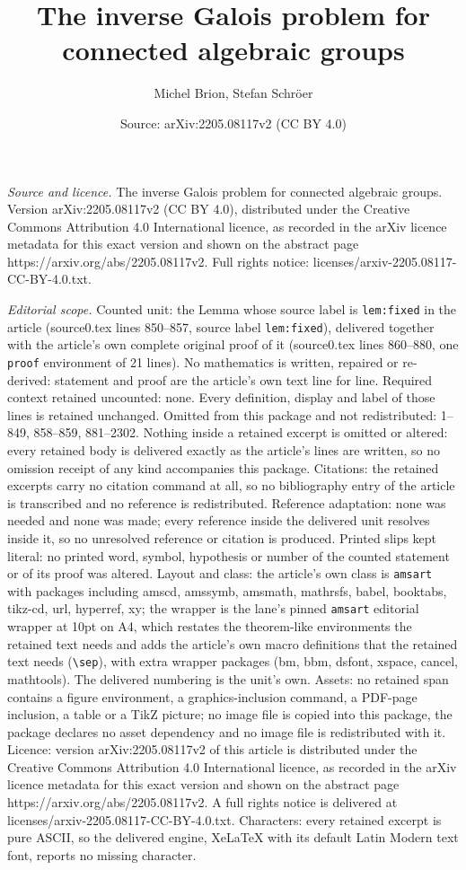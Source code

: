 \documentclass[10pt,a4paper]{amsart}
\title[The inverse Galois problem for connected algebraic groups]{The inverse Galois problem for connected algebraic groups}
\author{Michel Brion, Stefan Schr\"oer}
\date{Source: arXiv:2205.08117v2 (CC BY 4.0)}
\begin{document}
\maketitle

\noindent\emph{Source and licence.} The inverse Galois problem for connected algebraic groups. Version arXiv:2205.08117v2 (CC BY 4.0), distributed under the Creative Commons Attribution 4.0 International licence, as recorded in the arXiv licence metadata for this exact version and shown on the abstract page https://arxiv.org/abs/2205.08117v2. Full rights notice: licenses/arxiv-2205.08117-CC-BY-4.0.txt.\par\smallskip

\noindent\textit{Editorial scope.} Counted unit: the Lemma whose source label is \texttt{lem:fixed} in the article (source0.tex lines 850--857, source label \texttt{lem:fixed}), delivered together with the article's own complete original proof of it (source0.tex lines 860--880, one \texttt{proof} environment of 21 lines). No mathematics is written, repaired or re-derived: statement and proof are the article's own text line for line. Required context retained uncounted: none. Every definition, display and label of those lines is retained unchanged. Omitted from this package and not redistributed: 1--849, 858--859, 881--2302. Nothing inside a retained excerpt is omitted or altered: every retained body is delivered exactly as the article's lines are written, so no omission receipt of any kind accompanies this package. Citations: the retained excerpts carry no citation command at all, so no bibliography entry of the article is transcribed and no reference is redistributed. Reference adaptation: none was needed and none was made; every reference inside the delivered unit resolves inside it, so no unresolved reference or citation is produced. Printed slips kept literal: no printed word, symbol, hypothesis or number of the counted statement or of its proof was altered. Layout and class: the article's own class is \texttt{amsart} with packages including amscd, amssymb, amsmath, mathrsfs, babel, booktabs, tikz-cd, url, hyperref, xy; the wrapper is the lane's pinned \texttt{amsart} editorial wrapper at 10pt on A4, which restates the theorem-like environments the retained text needs and adds the article's own macro definitions that the retained text needs (\texttt{\textbackslash sep}), with extra wrapper packages (bm, bbm, dsfont, xspace, cancel, mathtools). The delivered numbering is the unit's own. Assets: no retained span contains a figure environment, a graphics-inclusion command, a PDF-page inclusion, a table or a TikZ picture; no image file is copied into this package, the package declares no asset dependency and no image file is redistributed with it. Licence: version arXiv:2205.08117v2 of this article is distributed under the Creative Commons Attribution 4.0 International licence, as recorded in the arXiv licence metadata for this exact version and shown on the abstract page https://arxiv.org/abs/2205.08117v2. A full rights notice is delivered at licenses/arxiv-2205.08117-CC-BY-4.0.txt. Characters: every retained excerpt is pure ASCII, so the delivered engine, XeLaTeX with its default Latin Modern text font, reports no missing character.
\end{document}
